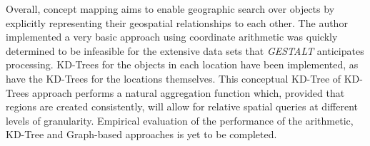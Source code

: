 Overall, concept mapping aims to enable geographic search over objects by explicitly representing their geospatial relationships to each other. 
The author implemented a very basic approach using coordinate arithmetic was quickly determined to be infeasible for the extensive data sets that \textit{GESTALT} anticipates processing. 
KD-Trees for the objects in each location have been implemented, as have the KD-Trees for the locations themselves. 
This conceptual KD-Tree of KD-Trees approach performs a natural aggregation function which, provided that regions are created consistently, will allow for relative spatial queries at different levels of granularity. 
Empirical evaluation of the performance of the arithmetic, KD-Tree and Graph-based approaches is yet to be completed. 